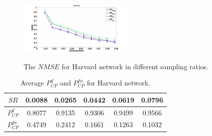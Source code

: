 \begin{figure}
  \begin{center}
    {\includegraphics[keepaspectratio, width=0.49\textwidth]{HarvardGADelay.png}}
  \end{center}
  \caption{{{The $NMSE$ for Harvard network in different sampling ratios.}}}
  \label{fig:HarvardGADelayNoise}
\end{figure}

\begin{table}
	\centering
 \small{
		\begin{tabular}{| c | c | c | c | c | c |}
		\hline
       $SR$           &    0.0088  &  0.0265  &  0.0442  &  0.0619  &  0.0796  \\ \hline
      $P^{d}_{CP}$    &    0.8077  &  0.9135  &  0.9306  &  0.9499  &  0.9566  \\ \hline
      $P^{fa}_{CP}$   &    0.4749  &  0.2412  &  0.1661  &  0.1263  &  0.1032  \\ \hline
    \end{tabular}
	\caption{{Average $P^{d}_{CP}$ and $P^{fa}_{CP}$ for Harvard network.}}
	\label{tab:PdfaHarvard}
}
\end{table}

